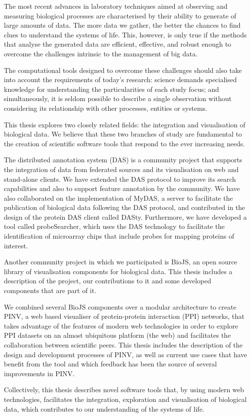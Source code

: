 
The most recent advances in laboratory techniques aimed at observing and measuring biological processes are characterised by their ability to generate of large amounts of data. The more data we gather, the better the chances to find clues to understand the systems of life. This, however, is only true if the methods that analyse the generated data are efficient, effective, and robust enough to overcome the challenges intrinsic to the management of big data.

The computational tools designed to overcome these challenges should also take into account the requirements of today's research: science demands specialised knowledge for understanding the particularities of each study focus; and simultaneously, it is seldom possible to describe a single observation without considering its relationship with other processes, entities or systems.

This thesis explores two closely related fields: the integration and visualisation of biological data. We believe that these two branches of study are fundamental to the creation of scientific software tools that respond to the ever increasing needs.

The distributed annotation system (DAS) is a community project that supports the integration of data from federated sources and its visualisation on web and stand-alone clients. We have extended the DAS protocol to improve its search capabilities and also to support feature annotation by the community. We have also collaborated on the implementation of MyDAS, a server to facilitate the publication of biological data following the DAS protocol, and contributed in the design of the protein DAS client called DASty. Furthermore, we have developed a tool called probeSearcher, which uses the DAS technology to facilitate the identification of microarray chips that include probes for mapping proteins of interest.

Another community project in which we participated is BioJS, an open source library of visualisation components for biological data. This thesis includes a description of the project, our contributions to it and some developed components that are part of it.

We combined several BioJS components over a modular architecture to create PINV, a web based visualiser of protein-protein interaction (PPI) networks, that takes advantage of the features of modern web technologies in order to explore PPI datasets on an almost ubiquitous platform (the web) and facilitates the collaboration between scientific peers. This thesis includes the description of the design and development processes of PINV, as well as current use cases that have benefit from the tool and which feedback has been the source of several improvements in PINV.

Collectively, this thesis describes novel software tools that, by using modern web technologies, facilitates the integration, exploration and visualisation of biological data, which contributes to our understanding of the systems of life.
